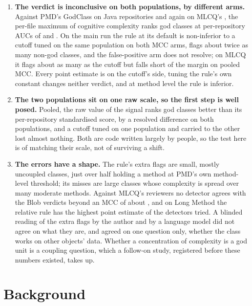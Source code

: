 \documentclass[11pt,a4paper]{article}
\begin{document}
\begin{enumerate}
\item \textbf{The verdict is inconclusive on both populations, by different
  arms.} Against PMD's GodClass on \nJava{} Java repositories and again on
  MLCQ's \mlcqUsable{}, the per-file maximum of cognitive complexity ranks god
  classes at per-repository AUCs of \primAucMacro{} and \mlcqPmdAucMacro{}. On the main run the rule
  at its default is non-inferior to a cutoff tuned on the same population on
  both MCC arms, flags about twice as many non-god classes, and the
  false-positive arm does not resolve; on MLCQ it flags about as many as the
  cutoff but falls short of the margin on pooled MCC. Every point estimate is
  on the cutoff's side, tuning the rule's own constant changes neither
  verdict, and at method level the rule is inferior.
\item \textbf{The two populations sit on one raw scale, so the first step is
  well posed.} Pooled, the raw value of the signal ranks god classes better
  than its per-repository standardised score, by a resolved difference on
  both populations, and a cutoff tuned on one population and carried to the
  other lost almost nothing. Both are code written largely by people, so the
  test here is of matching their scale, not of surviving a shift.
\item \textbf{The errors have a shape.} The rule's extra flags are small,
  mostly uncoupled classes, just over half holding a method at PMD's own
  method-level threshold; its misses are large classes whose complexity is
  spread over many moderate methods. Against MLCQ's reviewers no detector
  agrees with the Blob verdicts beyond an MCC of about \agrBlobMaxMcc{}, and
  on Long Method the relative rule has the highest point estimate of the
  detectors tried. A blinded reading of the extra flags by the author and by
  a language model did not agree on what they are, and agreed on one
  question only, whether the class works on other objects' data. Whether a
  concentration of complexity is a god unit is a coupling question, which a
  follow-on study, registered before these numbers existed, takes up.
\end{enumerate}

\section{Background}
\label{sec:related}
\end{document}
